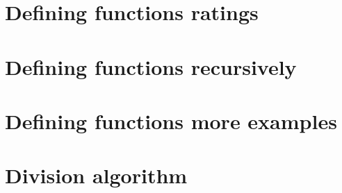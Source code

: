 \section*{Defining functions ratings}

\vfill
\section*{Defining functions recursively}

\vfill
\section*{Defining functions more examples}

\vfill
\section*{Division algorithm}

\vfill
